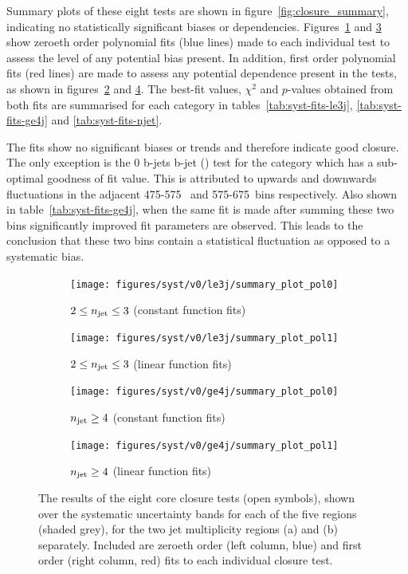 Summary plots of these eight tests are shown in
figure~\ref{fig:closure_summary}, indicating no statistically significant biases
or \HT dependencies. Figures~\ref{fig:closure_fit_le3j_pol0} and \ref{fig:closure_fit_ge4j_pol0} show
zeroeth order polynomial fits (blue lines) made to each individual test to assess the 
level of any potential bias present. In addition, first order polynomial fits 
(red lines) are made to assess any potential \HT dependence present in the
tests, as shown
in figures~\ref{fig:closure_fit_le3j_pol1} and \ref{fig:closure_fit_ge4j_pol1}.
The best-fit values, $\chi^2$ and $p$-values 
obtained from both fits are summarised for each \nj category in
tables~\ref{tab:syst-fits-le3j}, \ref{tab:syst-fits-ge4j} and
\ref{tab:syst-fits-njet}.

The fits show no significant biases or trends and therefore indicate good
closure. The only exception is the 0 b-jets  b-jet (\mj) test for the
\njhigh category which has a sub-optimal goodness of fit value. This is 
attributed to upwards and downwards fluctuations in the adjacent 475-575~\gev
and 575-675~\gev bins respectively. Also shown in table~\ref{tab:syst-fits-ge4j},
when the same fit is made after summing these two bins significantly improved
fit parameters are observed. This leads to the conclusion that these two
bins contain a statistical fluctuation as opposed to a systematic bias.

\begin{figure}[t]
  \centering
  \begin{subfigure}[b]{0.46\textwidth}
    \texttt{[image: figures/syst/v0/le3j/summary\_plot\_pol0]}
    \caption{$2 \leq n_{\text{jet}} \leq 3$ (constant function fits)}
    \label{fig:closure_fit_le3j_pol0}
  \end{subfigure}
  \begin{subfigure}[b]{0.46\textwidth}
    \texttt{[image: figures/syst/v0/le3j/summary\_plot\_pol1]}
    \caption{$2 \leq n_{\text{jet}} \leq 3$ (linear function fits)}
    \label{fig:closure_fit_le3j_pol1}
  \end{subfigure}
  \begin{subfigure}[b]{0.46\textwidth}
    \texttt{[image: figures/syst/v0/ge4j/summary\_plot\_pol0]}
    \caption{$n_{\text{jet}} \geq 4$ (constant function fits)}
    \label{fig:closure_fit_ge4j_pol0}
  \end{subfigure}
  \begin{subfigure}[b]{0.46\textwidth}
    \texttt{[image: figures/syst/v0/ge4j/summary\_plot\_pol1]}
    \caption{$n_{\text{jet}} \geq 4$ (linear function fits)}
    \label{fig:closure_fit_ge4j_pol1}
  \end{subfigure}
  \caption{The results of the eight core closure tests (open symbols), shown 
  over the systematic uncertainty bands for each of the five \HT regions
  (shaded grey), for the two jet multiplicity regions (a) \njlow and (b) \njhigh 
  separately. Included are zeroeth order (left column, blue) and first order
  (right column, red) fits to each individual closure test.}
  \label{fig:closure_fits}
\end{figure}

